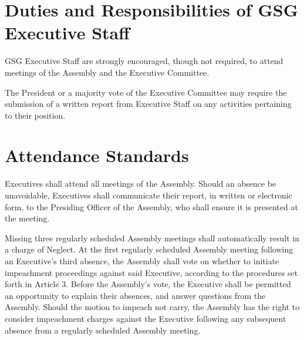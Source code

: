 \section{Duties and Responsibilities of GSG Executive Staff}
\begin{bylaws-number}
  \item GSG Executive Staff are strongly encouraged, though not required, to attend meetings of the Assembly and the Executive Committee.
  \item The President or a majority vote of the Executive Committee may require the submission of a written report from Executive Staff on any activities pertaining to their position.
\end{bylaws-number}

\section{Attendance Standards}
\begin{bylaws-number}
  \item Executives shall attend all meetings of the Assembly. Should an absence be unavoidable, Executives shall communicate their report, in written or electronic form, to the Presiding Officer of the Assembly, who shall ensure it is presented at the meeting.
  \item Missing three regularly scheduled Assembly meetings shall automatically result in a charge of Neglect. At the first regularly scheduled Assembly meeting following an Executive’s third absence, the Assembly shall vote on whether to initiate impeachment proceedings against said Executive, according to the procedures set forth in Article 3. Before the Assembly’s vote, the Executive shall be permitted an opportunity to explain their absences, and answer questions from the Assembly. Should the motion to impeach not carry, the Assembly has the right to consider impeachment charges against the Executive following any subsequent absence from a regularly scheduled Assembly meeting.
\end{bylaws-number}